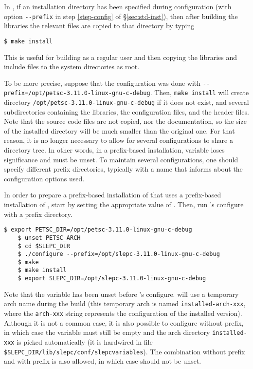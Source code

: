 In \petsc, if an installation directory has been specified during configuration (with option \Verb!--prefix! in step \ref{step-config} of \S\ref{sec:std-inst}), then after building the libraries the relevant files are copied to that directory by typing
	\begin{Verbatim}[fontsize=\small]
	$ make install
	\end{Verbatim}
	This is useful for building as a regular user and then copying the libraries and include files to the system directories as root.

To be more precise, suppose that the configuration was done with \texttt{-{}-prefix=/opt/petsc-3.11.0-linux-gnu-c-debug}. Then, \texttt{make install} will create directory \texttt{/opt/petsc-3.11.0-linux-gnu-c-debug} if it does not exist, and several subdirectories containing the libraries, the configuration files, and the header files. Note that the source code files are not copied, nor the documentation, so the size of the installed directory will be much smaller than the original one. For that reason, it is no longer necessary to allow for several configurations to share a directory tree. In other words, in a prefix-based installation, variable  loses significance and must be unset. To maintain several configurations, one should specify different prefix directories, typically with a name that informs about the configuration options used.

In order to prepare a prefix-based installation of \slepc that uses a prefix-based installation of \petsc, start by setting the appropriate value of . Then, run \slepc's configure with a prefix directory.
	\begin{Verbatim}[fontsize=\small,numbers=none]
	$ export PETSC_DIR=/opt/petsc-3.11.0-linux-gnu-c-debug
	$ unset PETSC_ARCH
	$ cd $SLEPC_DIR
	$ ./configure --prefix=/opt/slepc-3.11.0-linux-gnu-c-debug
	$ make
	$ make install
	$ export SLEPC_DIR=/opt/slepc-3.11.0-linux-gnu-c-debug
	\end{Verbatim}
Note that the variable  has been unset before \slepc's configure. \slepc will use a temporary arch name during the build (this temporary arch is named \texttt{installed-arch-xxx}, where the \texttt{arch-xxx} string represents the configuration of the installed \petsc version). Although it is not a common case, it is also possible to configure \slepc without prefix, in which case the  variable must still be empty and the arch directory \texttt{installed-xxx} is picked automatically (it is hardwired in file \texttt{\$SLEPC\_DIR/lib/slepc/conf/slepcvariables}). The combination \petsc without prefix and \slepc with prefix is also allowed, in which case  should not be unset.

